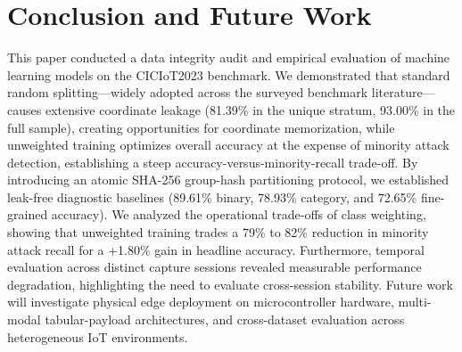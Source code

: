 \documentclass[conference,10pt,twocolumn]{IEEEtran}
\begin{document}
\section{Conclusion and Future Work}
\label{sec:conclusion}

This paper conducted a data integrity audit and empirical evaluation of machine learning models on the CICIoT2023 benchmark. We demonstrated that standard random splitting---widely adopted across the surveyed benchmark literature---causes extensive coordinate leakage (81.39\% in the unique stratum, 93.00\% in the full sample), creating opportunities for coordinate memorization, while unweighted training optimizes overall accuracy at the expense of minority attack detection, establishing a steep accuracy-versus-minority-recall trade-off. By introducing an atomic SHA-256 group-hash partitioning protocol, we established leak-free diagnostic baselines (89.61\% binary, 78.93\% category, and 72.65\% fine-grained accuracy). We analyzed the operational trade-offs of class weighting, showing that unweighted training trades a 79\% to 82\% reduction in minority attack recall for a +1.80\% gain in headline accuracy. Furthermore, temporal evaluation across distinct capture sessions revealed measurable performance degradation, highlighting the need to evaluate cross-session stability. Future work will investigate physical edge deployment on microcontroller hardware, multi-modal tabular-payload architectures, and cross-dataset evaluation across heterogeneous IoT environments.



\end{document}
